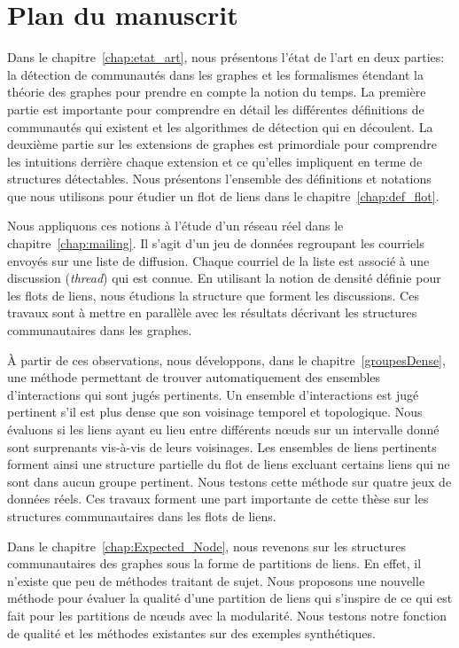 \section*{Plan du manuscrit}


Dans le chapitre~\ref{chap:etat_art}, nous présentons l'état de l'art en deux parties: la détection de communautés dans les graphes et les formalismes étendant la théorie des graphes pour prendre en compte la notion du temps.
La première partie est importante pour comprendre en détail les différentes définitions de communautés qui existent et les algorithmes de détection qui en découlent.
La deuxième partie sur les extensions de graphes est primordiale pour comprendre les intuitions derrière chaque extension et ce qu'elles impliquent en terme de structures détectables.
Nous présentons l'ensemble des définitions et notations que nous utilisons pour étudier un flot de liens dans le chapitre~\ref{chap:def_flot}.

Nous appliquons ces notions à l'étude d'un réseau réel dans le chapitre~\ref{chap:mailing}.
Il s'agit d'un jeu de données regroupant les courriels envoyés sur une liste de diffusion.
Chaque courriel de la liste est associé à une discussion (\emph{thread}) qui est connue.
En utilisant la notion de densité définie pour les flots de liens, nous étudions la structure que forment les discussions.
Ces travaux sont à mettre en parallèle avec les résultats décrivant les structures communautaires dans les graphes.


\`A partir de ces observations, nous développons, dans le chapitre~\ref{groupesDense}, une méthode permettant de trouver automatiquement des ensembles d'interactions qui sont jugés pertinents.
Un ensemble d'interactions est jugé pertinent s’il est plus dense que son voisinage temporel et topologique.
Nous évaluons si les liens ayant eu lieu entre différents n\oe{}uds sur un intervalle donné sont surprenants vis-à-vis de leurs voisinages.
Les  ensembles de liens pertinents forment ainsi une structure partielle du flot de liens excluant certains liens qui ne sont dans aucun groupe pertinent.
Nous testons cette méthode sur quatre jeux de données réels.
Ces travaux forment une part importante de cette thèse sur les structures communautaires dans les flots de liens.

Dans le chapitre~\ref{chap:Expected_Node}, nous revenons sur les structures communautaires des graphes sous la forme de partitions de liens.
En effet, il n'existe que peu de méthodes traitant de sujet.
Nous proposons une nouvelle méthode pour évaluer la qualité d'une partition de liens qui s'inspire de ce qui est fait pour les partitions de n\oe{}uds avec la modularité.
Nous testons notre fonction de qualité et les méthodes existantes sur des exemples synthétiques.

